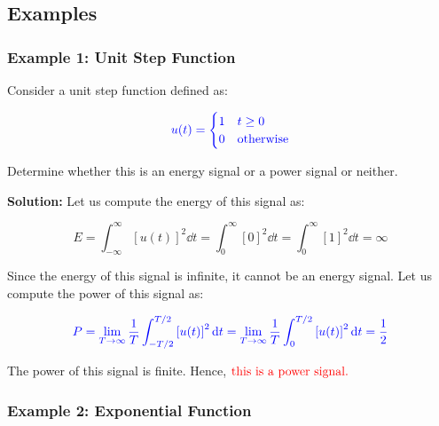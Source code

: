 \documentclass[
  12pt,
  a4paper,
]{report}
\newcommand{\bluetext}[1]{\textcolor{blue}{#1}}
\begin{document}
\subsection{Examples}\label{examples}

\subsubsection{Example 1: Unit Step
Function}\label{example-1-unit-step-function}

Consider a unit step function defined as:

\begin{equation}
    \label{eq:unit-step-function-example}     
    \bluetext{u(t) =         
        \begin{cases}             
        1 & t \geq 0         \\             
        0 & \text{otherwise}         
        \end{cases}} 
\end{equation}

Determine whether this is an energy signal or a power signal or neither.

\textbf{Solution:} Let us compute the energy of this signal as:

\begin{equation}     
    \label{eq:unit-step-energy}     
    E = \int_{-\infty}^{\infty} {[u(t)]}^2 \dd{t} = \int_{0}^{\infty} {[0]}^2 \dd{t} = \int_{0}^{\infty} {[1]}^2 \dd{t} = \infty 
\end{equation}

Since the energy of this signal is infinite, it cannot be an energy
signal. Let us compute the power of this signal as:

\begin{equation}     
    \label{eq:unit-step-power}     
    \bluetext{P = \lim_{T \to \infty} \frac{1}{T} \int_{-T/2}^{T/2} {[u(t)]}^2 \dd{t} = \lim_{T \to \infty} \frac{1}{T} \int_{0}^{T/2} {[u(t)]}^2 \dd{t} = \frac{1}{2}} 
\end{equation}

The power of this signal is finite. Hence,
\(\textcolor{red}{\text{this is a power signal.}}\)

\subsubsection{Example 2: Exponential
Function}\label{example-2-exponential-function}
\end{document}
